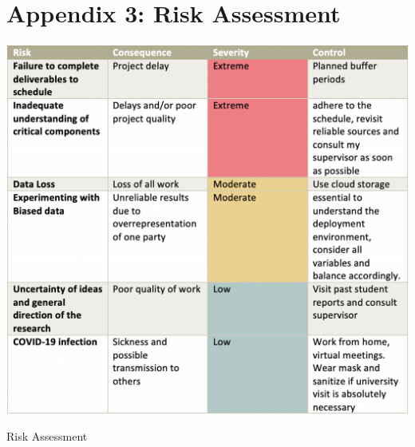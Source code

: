 \documentclass[a4paper,12pt]{report}
\begin{document}
\section{Appendix 3: Risk Assessment}
\label{sec:app3}
\begin{table}[H]
    \centering
    \hspace*{-1.5cm}  
    \includegraphics[width=1.2\textwidth]{risk assessment.png}
    \caption{Risk Assessment}
    \label{tab:Risk}
\end{table}
\end{document}
